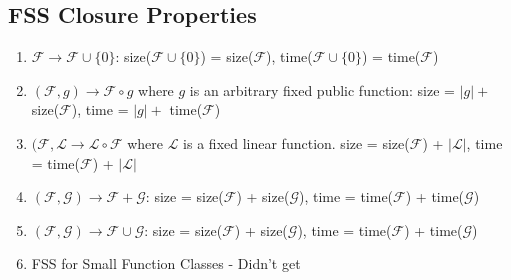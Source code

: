 \subsection{FSS Closure Properties}
\begin{enumerate}
    \item $\mathcal{F} \rightarrow \mathcal{F} \cup \{0\}$: size($\mathcal{F} \cup \{0\}$) = size($\mathcal{F}$), time($\mathcal{F} \cup \{0\}$) = time($\mathcal{F}$)
    \item $(\mathcal{F}, g) \rightarrow \mathcal{F} \circ g$ where $g$ is an arbitrary fixed public function: size = $|g| + $ size($\mathcal{F}$), time = $|g| + $ time($\mathcal{F}$)
    \item $(\mathcal{F}, \mathcal{L} \rightarrow \mathcal{L} \circ \mathcal{F}$ where $\mathcal{L}$ is a fixed linear function. size = size($\mathcal{F}$) + $|\mathcal{L}|$, time = time($\mathcal{F}$) + $|\mathcal{L}|$
    \item $(\mathcal{F}, \mathcal{G}) \rightarrow \mathcal{F} + \mathcal{G}$: size = size($\mathcal{F}$) + size($\mathcal{G}$), time = time($\mathcal{F}$) + time($\mathcal{G}$)
    \item $(\mathcal{F}, \mathcal{G}) \rightarrow \mathcal{F} \cup \mathcal{G}$: size = size($\mathcal{F}$) + size($\mathcal{G}$), time = time($\mathcal{F}$) + time($\mathcal{G}$)
    \item FSS for Small Function Classes - Didn't get 
\end{enumerate}
%
